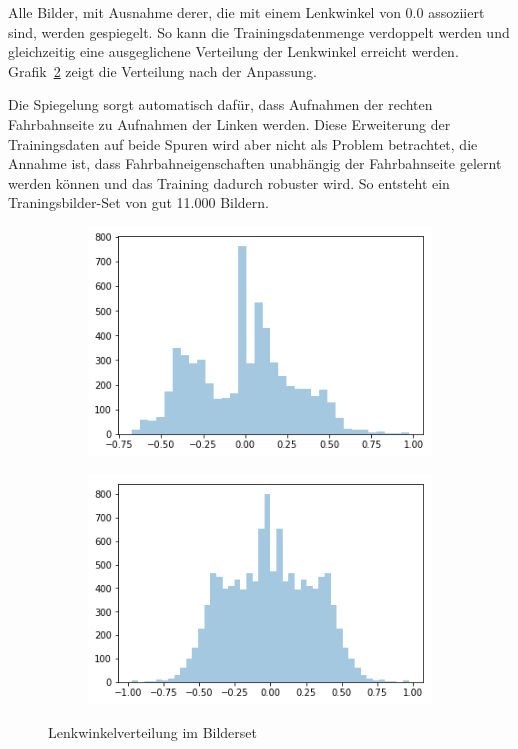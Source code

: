 Alle Bilder, mit Ausnahme derer, die mit einem Lenkwinkel von 0.0 assoziiert sind, werden gespiegelt. So kann die Trainingsdatenmenge verdoppelt werden und gleichzeitig eine ausgeglichene Verteilung der Lenkwinkel erreicht werden. Grafik~\ref{fig:anglesb} zeigt die Verteilung nach der Anpassung.

Die Spiegelung sorgt automatisch dafür, dass Aufnahmen der rechten Fahrbahnseite zu Aufnahmen der Linken werden. Diese Erweiterung der Trainingsdaten auf beide Spuren wird aber nicht als Problem betrachtet, die Annahme ist, dass Fahrbahneigenschaften unabhängig der Fahrbahnseite gelernt werden können und das Training dadurch robuster wird. So entsteht ein Traningsbilder-Set von gut 11.000 Bildern.

\begin{figure}[h]
	\centering
	\begin{subfigure}{.5\textwidth}
	\centering
		  \includegraphics[width=1\linewidth]{figures/steeringAngleDistribution.png}
	 	  \caption{}
		  \label{fig:anglesa}
	\end{subfigure}%
	\begin{subfigure}{.5\textwidth}
	\centering
		  \includegraphics[width=1\linewidth]{figures/steeringAngleDistributionFlipped.png}
	 	  \caption{}
		  \label{fig:anglesb}
	\end{subfigure}%
	\caption{Lenkwinkelverteilung im Bilderset}
	\label{fig:steuerungswinkel}
\end{figure}%


